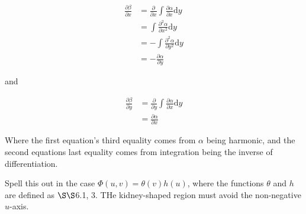 \documentclass[../the-road-to-reality.tex]{subfiles}
\begin{document}
\begin{questions}
\begin{solution}
        \begin{align*}
                \frac{\partial\beta}{\partial{x}} &= \frac{\partial}{\partial{x}}\int\frac{\partial\alpha}{\partial{x}}\mathrm{d}y \\
                &= \int\frac{\partial^2\alpha}{\partial{x}^2}\mathrm{d}y \\
                &= -\int\frac{\partial^2\alpha}{\partial{y}^2}\mathrm{d}y \\
                &= -\frac{\partial\alpha}{\partial{y}}
        \end{align*}

        and

        \begin{align*}
                \frac{\partial\beta}{\partial{y}} &= \frac{\partial}{\partial{y}}\int\frac{\partial\alpha}{\partial{x}}\mathrm{d}y \\
                &= \frac{\partial\alpha}{\partial{x}}
        \end{align*}

        Where the first equation's third equality comes from $\alpha$ being harmonic, and the second equations last equality comes from integration being the inverse of differentiation.
\end{solution}

\question Spell this out in the case $\Phi(u, v) = \theta(v)h(u)$, where the functions $\theta$ and $h$ are defined as $\S\S$6.1, 3. THe kidney-shaped region must avoid the non-negative $u$-axis.

\end{questions}
	
\end{document}
